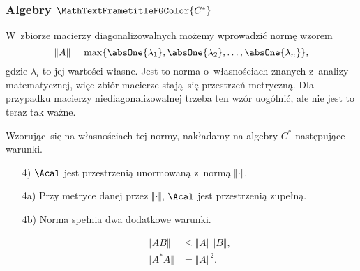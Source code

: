 \documentclass[10pt,t]{beamer}
\begin{document}
\begin{frame}
  \frametitle{Algebry $\MathTextFrametitleFGColor{C^{ * }}$}


  W~zbiorze macierzy diagonalizowalnych możemy wprowadzić normę wzorem
  \begin{equation}
    \label{eq:Niespodziewane-teoretyczne-01}
    \Vert A \Vert = \max\{ \absOne{ \lambda_{ 1 } }, \absOne{ \lambda_{ 2 } }, \ldots,
    \absOne{ \lambda_{ n } } \},
  \end{equation}
  gdzie $\lambda_{ i }$ to jej wartości własne. Jest to norma o~własnościach
  znanych z~analizy matematycznej, więc zbiór macierze stają~się przestrzeń
  metryczną. Dla przypadku macierzy niediagonalizowalnej trzeba ten wzór
  uogólnić, ale nie jest to teraz tak ważne.

  Wzorując~się na własnościach tej normy, nakładamy na algebry $C^{ * }$
  następujące warunki.

  \begin{itemize}

  \item[4)] $\Acal$ jest przestrzenią unormowaną z~normą $\Vert \cdot \Vert$.

  \item[4a)] Przy metryce danej przez $\Vert \cdot \Vert$, $\Acal$ jest przestrzenią
    zupełną.

  \item[4b)] Norma spełnia dwa dodatkowe warunki.

    \vspace{-1.7em}



    \begin{subequations}

      \begin{align}
        \label{eq:Niespodziewane-teoretyczne-01}
        \Vert A B \Vert &\leq \Vert A \Vert \, \Vert B \Vert, \\
        \Vert A^{ * } A \Vert &= \Vert A \Vert^{ 2 }.
      \end{align}

    \end{subequations}


  \end{itemize}


\end{frame}
\end{document}
